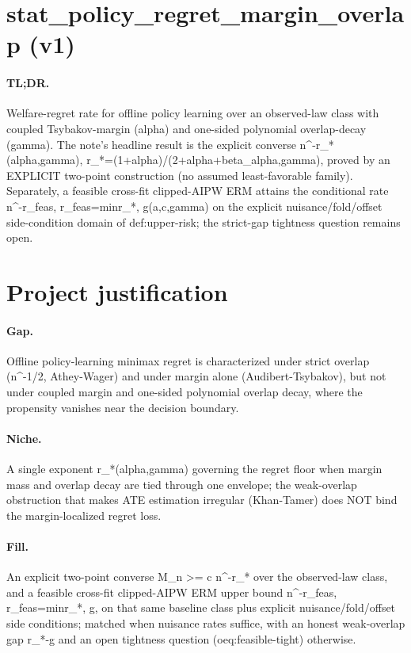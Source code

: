 \documentclass{article}
\begin{document}
\section*{stat_policy_regret_margin_overlap (v1)}

\paragraph{TL;DR.} Welfare-regret rate for offline policy learning over an observed-law class with coupled Tsybakov-margin (alpha) and one-sided polynomial overlap-decay (gamma). The note's headline result is the explicit converse n^{-r_*(alpha,gamma)}, r_*=(1+alpha)/(2+alpha+beta_{alpha,gamma}), proved by an EXPLICIT two-point construction (no assumed least-favorable family). Separately, a feasible cross-fit clipped-AIPW ERM attains the conditional rate n^{-r_feas}, r_feas=min{r_*, g(a,c,gamma)} on the explicit nuisance/fold/offset side-condition domain of def:upper-risk; the strict-gap tightness question remains open.

\section{Project justification}

\paragraph{Gap.} Offline policy-learning minimax regret is characterized under strict overlap (n^{-1/2}, Athey-Wager) and under margin alone (Audibert-Tsybakov), but not under coupled margin and one-sided polynomial overlap decay, where the propensity vanishes near the decision boundary.

\paragraph{Niche.} A single exponent r_*(alpha,gamma) governing the regret floor when margin mass and overlap decay are tied through one envelope; the weak-overlap obstruction that makes ATE estimation irregular (Khan-Tamer) does NOT bind the margin-localized regret loss.

\paragraph{Fill.} An explicit two-point converse M_n >= c n^{-r_*} over the observed-law class, and a feasible cross-fit clipped-AIPW ERM upper bound n^{-r_feas}, r_feas=min{r_*, g}, on that same baseline class plus explicit nuisance/fold/offset side conditions; matched when nuisance rates suffice, with an honest weak-overlap gap r_*-g and an open tightness question (oeq:feasible-tight) otherwise.
\end{document}
